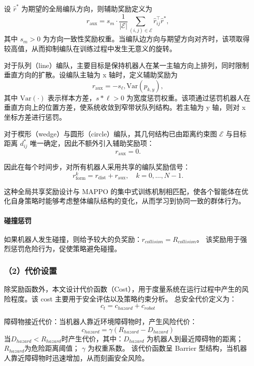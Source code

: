 设 $\hat{r}^*$ 为期望的全局编队方向，则辅助奖励定义为
\[
r_{\mathrm{aux}} =
s_m \cdot
\frac{1}{|\mathcal{E}|}
\sum_{(i,j)\in\mathcal{E}}
\hat{r}_{ij}^\top \hat{r}^*,
\]
其中 $s_m>0$ 为方向一致性奖励权重。当编队边方向与期望方向对齐时，该项取得较高值，从而抑制编队在训练过程中发生无意义的旋转。

对于队列（line）编队，主要目标是保持机器人在某一主轴方向上排列，同时限制垂直方向的扩散。设编队主轴为 x 轴时，定义辅助奖励为
\[
r_{\mathrm{aux}} = - s_\ell , \mathrm{Var}( {p_{k,y}}),
\]
其中 $\mathrm{Var}(\cdot)$ 表示样本方差，$s*\ell>0$ 为宽度惩罚权重。该项通过惩罚机器人在垂直方向上的位置方差，使系统收敛到窄带状队列结构。若主轴为 y 轴，则对 x 坐标方差进行惩罚。

对于楔形（wedge）与圆形（circle）编队，其几何结构已由距离约束图 $\mathcal{E}$ 与目标距离 $d_{ij}^*$ 唯一确定，因此不额外引入辅助奖励项：
\[
r_{\mathrm{aux}} = 0.
\]

因此在每个时间步，对所有机器人采用共享的编队奖励信号：
\[
r_{\mathrm{form}}^k = r_{\mathrm{dist}} + r_{\mathrm{aux}},
\quad k = 0, \ldots, N-1.
\]

这种全局共享奖励设计与 MAPPO 的集中式训练机制相匹配，使各个智能体在优化自身策略时能够考虑整体编队结构的变化，从而学习到协同一致的群体行为。

\paragraph{碰撞惩罚}

如果机器人发生碰撞，则给予较大的负奖励：$r_{collision} = R_{collision}$。
该奖励用于强烈惩罚危险行为，促使策略避免碰撞。

\subsubsection{（2）代价设置}

除奖励函数外，本文设计代价函数（Cost），用于度量系统在运行过程中产生的风险程度。该 cost 主要用于安全评估以及策略约束分析。
总安全代价定义为：
\begin{equation}
    c_t = c_{hazard} + c_{robot}
\end{equation}

障碍物接近代价：当机器人靠近环境障碍物时，产生风险代价：
\begin{equation}
    c_{hazard} = \gamma (R_{hazard} - D_{hazard})
\end{equation}
当$D_{hazard} < R_{hazard}$时产生代价，其中：$D_{hazard}$ 为机器人到最近障碍物的距离；$R_{hazard}$为危险距离阈值； $\gamma$ 为权重系数。
该代价函数呈 Barrier 型结构，当机器人靠近障碍物时迅速增加，从而刻画安全风险。

